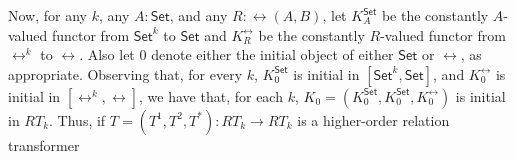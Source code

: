 \documentclass{lmcs}
\theoremstyle{plain}\newtheorem{satz}[thm]{Satz}
\newcommand{\cal}{\mathcal}
\newcommand{\set}{\mathsf{Set}}
\begin{document}
{%
Now, for any $k$, any $A : \set$, and any $R : \rel(A, B)$, let
$K^\set_A$ be the constantly $A$-valued functor from $\set^k$ to
$\set$ and $K^\rel_R$ be the constantly $R$-valued functor from
$\rel^k$ to $\rel$.  Also let $0$ denote either the initial object of
either $\set$ or $\rel$, as appropriate.  Observing that, for every
$k$, $K^\set_0$ is initial in $[\set^k,\set]$, and $K^\rel_0$ is
initial in $[\rel^k,\rel]$, we have that, for each $k$, $K_0 =
(K^\set_0,K^\set_0,K^\rel_0)$ is initial in $RT_k$. Thus, if $T =
(T^1,T^2,T^*) : RT_k \to RT_k$ is a higher-order relation transformer
}
\end{document}
